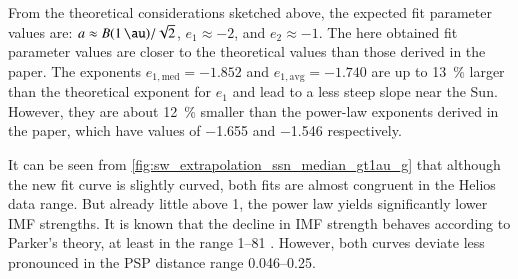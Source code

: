 From the theoretical considerations sketched above, the expected fit parameter values are: \mbox{$a \approx B(\SI{1}{\au}) / \sqrt{2}$}, $e_1 \approx -2$, and $e_2 \approx -1$. The here obtained fit parameter values are closer to the theoretical values than those derived in the paper. The exponents $e_{1, \text{med}} = -1.852$ and $e_{1, \text{avg}} = -1.740$ are up to \SI{13}{\%} larger than the theoretical exponent for $e_1$ and lead to a less steep slope near the Sun. However, they are about \SI{12}{\%} smaller than the power-law exponents derived in the paper, which have values of \num{-1.655} and \num{-1.546} respectively.

\pagebreak

It can be seen from \autoref{fig:sw_extrapolation_ssn_median_gt1au_g} that although the new fit curve is slightly curved, both fits are almost congruent in the Helios data range. But already little above \SI{1}{\au}, the power law yields significantly lower IMF strengths. It is known that the decline in IMF strength behaves according to Parker's theory, at least in the range \SIrange{1}{81}{\au} \citep{Burlaga2002}. However, both curves deviate less pronounced in the PSP distance range \SIrange{0.046}{0.25}{\au}.
\begin{figure}[htb]
\end{figure}


